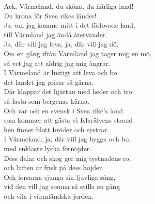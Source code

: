 \documentclass[a6paper, 10pt, twoside]{article}
\begin{document}
\noindent
\begin{center}
\end{center}
\begin{lyrics}
Ack, Värmeland, du sköna, du härliga land!  \\
Du krona för Svea rikes länder!  \\
Ja, om jag komme mitt i det förlovade land,  \\
till Värmland jag ändå återvänder.  \\
Ja, där vill jag leva, ja, där vill jag dö.  \\
Om en gång ifrån Värmland jag tager mig en mö,  \\
så vet jag att aldrig jag mig ångrar. 
\vspace{5pt}\\
I Värmeland är lustigt att leva och bo\\
det landet jag prisar så gärna.\\
Där klappar det hjärtan med heder och tro\\
så fasta som bergenas kärna.\\
Och var och en svensk i Svea rike's land\\
som kommer att gästa vi Klarälvens strand\\
hen finner blott bröder och systrar.
\vspace{5pt}\\
I Värmeland, ja, där vill jag bygga och bo,\\
med enklaste lycka förnöjder.\\
Dess dalar och skog ger mig tystnadens ro,\\
och luften är frisk på dess höjder.\\
Och forsarna sjunga sin ljuvliga sång,\\
vid den vill jag somna så stilla en gång\\
och vila i värmländska jorden.
\end{lyrics}
\end{document}
